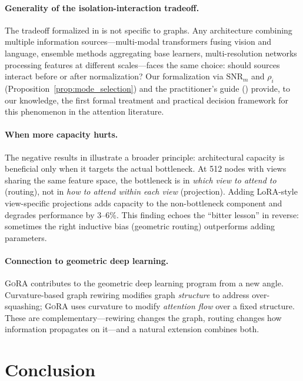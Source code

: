 \documentclass[11pt,a4paper]{article}
\newcommand{\ours}{\textsc{GoRA}}  %
\begin{document}
\paragraph{Generality of the isolation-interaction tradeoff.}
The tradeoff formalized in  is not specific to
graphs.
Any architecture combining multiple information sources---multi-modal
transformers fusing vision and language, ensemble methods aggregating
base learners, multi-resolution networks processing features at
different scales---faces the same choice: should sources interact
before or after normalization?
Our formalization via $\mathrm{SNR}_m$ and $\rho_i$
(Proposition~\ref{prop:mode_selection}) and the practitioner's guide
() provide, to our knowledge, the first formal
treatment and practical decision framework for this phenomenon in the
attention literature.

\paragraph{When more capacity hurts.}
The negative results in  illustrate a broader
principle: architectural capacity is beneficial only when it targets the
actual bottleneck.
At 512 nodes with views sharing the same feature space, the bottleneck
is in \emph{which view to attend to} (routing), not in \emph{how to
attend within each view} (projection).
Adding LoRA-style view-specific projections adds capacity to the
non-bottleneck component and degrades performance by 3--6\%.
This finding echoes the ``bitter lesson'' in reverse: sometimes the
right inductive bias (geometric routing) outperforms adding parameters.

\paragraph{Connection to geometric deep learning.}
\ours{} contributes to the geometric deep learning program from a new
angle.
Curvature-based graph rewiring \citep{topping2022understanding}
modifies graph \emph{structure} to address over-squashing; \ours{} uses
curvature to modify \emph{attention flow} over a fixed structure.
These are complementary---rewiring changes the graph, routing changes
how information propagates on it---and a natural extension combines
both.


\section{Conclusion}
\label{sec:conclusion}
\end{document}
